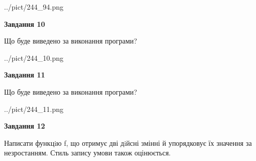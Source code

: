 \documentclass[12pt, ukrainian]{article}
\begin{document}
{\begin {large}
\begin{center}
	{../pict/244_94.png}
\end{center}
\newpage

{\begin {center}\textbf{Завдання 10}\end {center}}

Що буде виведено за виконання програми?\par
\begin{center}
	{../pict/244_10.png}
\end{center}
\newpage

{\begin {center}\textbf{Завдання 11}\end {center}}

Що буде виведено за виконання програми?\par
\begin{center}
	{../pict/244_11.png}
\end{center}
\newpage

{\begin {center}\textbf{Завдання 12}\end {center}}


Написати функцiю f, що отримує дві дiйсні змінні й упорядковує їх значення за незростанням. Стиль запису умови також оцінюється.\par
\newpage

\end {large}}
\end{document}
